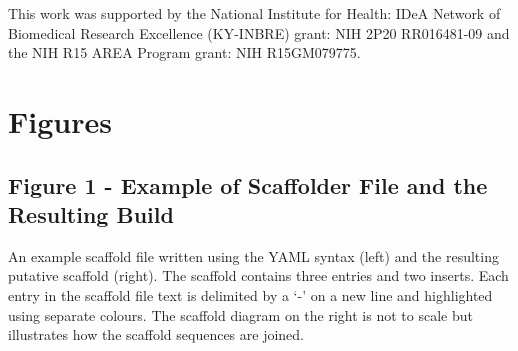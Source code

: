 \documentclass[10pt]{bmc_article}
\newenvironment{bmcformat}{\begin{raggedright}\baselineskip20pt\sloppy\setboolean{publ}{false}}{\end{raggedright}\baselineskip20pt\sloppy}
\begin{document}
\begin{bmcformat}
This work was supported by the National Institute for Health: IDeA Network of
Biomedical Research Excellence (KY-INBRE) grant: NIH 2P20 RR016481-09 and the
NIH R15 AREA Program grant: NIH R15GM079775.

\clearpage

{
   }     %


\clearpage

\section*{Figures} %

\subsection*{Figure 1 - Example of Scaffolder File and the Resulting Build}

An example scaffold file written using the YAML syntax \cite{yaml} (left) and
the resulting putative scaffold (right). The scaffold contains three entries
and two inserts. Each entry in the scaffold file text is delimited by a `-' on
a new line and highlighted using separate colours. The scaffold diagram on the
right is not to scale but illustrates how the scaffold sequences are joined.
\pb

\end{bmcformat}
\end{document}

